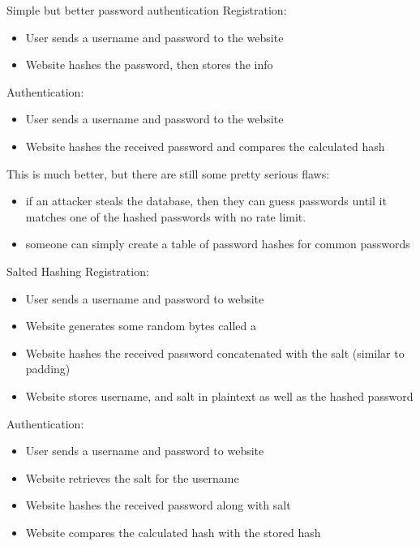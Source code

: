 \documentclass[code]{amznotes}
\begin{document}
\begin{exbox}{Simple but better password authentication}{}
    Registration:
    \begin{itemize}[noitemsep]
        \item User sends a username and password to the website
        \item Website hashes the password, then stores the info
    \end{itemize}
    Authentication:
    \begin{itemize}[noitemsep]
        \item User sends a username and password to the website
        \item Website hashes the received password and compares the calculated hash
    \end{itemize}
\end{exbox}

This is much better, but there are still some pretty serious flaws:
\begin{itemize}[noitemsep]
    \item {} if an attacker steals the database, then they can guess passwords until it matches one of the hashed passwords with no rate limit.
    \item {} someone can simply create a table of password hashes for common passwords
\end{itemize}

\begin{exbox}{Salted Hashing}{}
    Registration:
    \begin{itemize}[noitemsep]
        \item User sends a username and password to website
        \item Website generates some random bytes called a 
        \item Website hashes the received password concatenated with the salt (similar to padding)
        \item Website stores username, and salt in plaintext as well as the hashed password
    \end{itemize}
    Authentication:
    \begin{itemize}[noitemsep]
        \item User sends a username and password to website
        \item Website retrieves the salt for the username
        \item Website hashes the received password along with salt
        \item Website compares the calculated hash with the stored hash
    \end{itemize}
\end{exbox}
\end{document}

